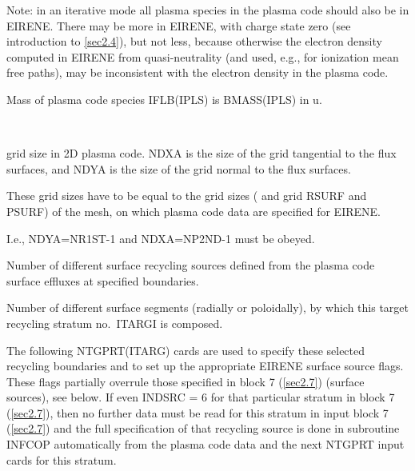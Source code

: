 \begin{description}
        Note: in an iterative mode all plasma species in the plasma code should also be
        in EIRENE.
        There may be more in EIRENE, with charge state zero (see introduction to
        \cref{sec2.4}), but not less, because otherwise the electron density computed
        in EIRENE from quasi-neutrality (and used, e.g., for ionization mean free
        paths), may be inconsistent with the electron density in the plasma code.
  \item[BMASS] Mass of plasma code species IFLB(IPLS) is BMASS(IPLS) in
        \si{\atomicmassunit}.
  \item[NDXA,NDYA] ~ 

        grid size in 2D plasma code.
        NDXA is the size of the grid tangential to the flux surfaces, and NDYA is the
        size of the grid normal to the flux surfaces.

        These grid sizes have to be equal to the grid sizes ( and
         grid RSURF and PSURF) of the mesh, on which plasma code data are
        specified for EIRENE.

        I.e., NDYA=NR1ST-1 and NDXA=NP2ND-1 must be obeyed.
  \item[NTARGI] Number of different surface recycling sources defined from the
        plasma code surface effluxes at specified boundaries.
  \item[NTGPRT] Number of different surface segments (radially or poloidally), by
        which this target recycling stratum no.\ ITARGI is composed.
\end{description}

The following NTGPRT(ITARG) cards are used to specify these selected recycling
boundaries and to set up the appropriate EIRENE surface source flags.
These flags partially overrule those specified in block 7 (\cref{sec2.7})
(surface sources), see below.
If even INDSRC = 6 for that particular stratum in block 7 (\cref{sec2.7}), then
no further data must be read for this stratum in input block 7 (\cref{sec2.7})
and the full specification of that recycling source is done in subroutine
INFCOP automatically from the plasma code data and the next NTGPRT input cards
for this stratum.

